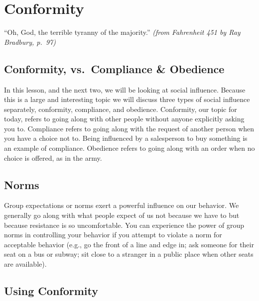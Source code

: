 \documentclass[
]{book}
\begin{document}
\hypertarget{conformity}{%
\section{Conformity}\label{conformity}}

``Oh, God, the terrible tyranny of the majority.'' \emph{(from Fahrenheit 451 by Ray Bradbury, p.~97)}

\hypertarget{conformity-vs.-compliance-obedience}{%
\subsection*{Conformity, vs.~Compliance \& Obedience}\label{conformity-vs.-compliance-obedience}}

In this lesson, and the next two, we will be looking at social influence. Because this is a large and interesting topic we will discuss three types of social influence separately, conformity, compliance, and obedience. Conformity, our topic for today, refers to going along with other people without anyone explicitly asking you to. Compliance refers to going along with the request of another person when you have a choice not to. Being influenced by a salesperson to buy something is an example of compliance. Obedience refers to going along with an order when no choice is offered, as in the army.

\hypertarget{norms}{%
\subsection*{Norms}\label{norms}}

Group expectations or norms exert a powerful influence on our behavior. We generally go along with what people expect of us not because we have to but because resistance is so uncomfortable. You can experience the power of group norms in controlling your behavior if you attempt to violate a norm for acceptable behavior (e.g., go the front of a line and edge in; ask someone for their seat on a bus or subway; sit close to a stranger in a public place when other seats are available).

\hypertarget{using-conformity}{%
\subsection*{Using Conformity}\label{using-conformity}}
\end{document}
